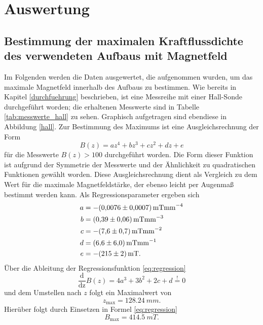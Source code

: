 \section{Auswertung}
\subsection{Bestimmung der maximalen Kraftflussdichte des verwendeten Aufbaus mit Magnetfeld}
Im Folgenden werden die Daten ausgewertet, die aufgenommen wurden, um das maximale Magnetfeld innerhalb des Aufbaus zu bestimmen. Wie bereits in Kapitel \ref{durchfuehrung} beschrieben, ist eine Messreihe mit einer Hall-Sonde durchgeführt worden; die erhaltenen Messwerte sind in Tabelle \ref{tab:messwerte_hall} zu sehen.
Graphisch aufgetragen sind ebendiese in Abbildung \ref{hall}. Zur Bestimmung des Maximums ist eine Ausgleichsrechnung der Form
\begin{equation}
B(z)=az^4+bz^3+cz^2+dz+e
\label{eq:regression}
\end{equation}
für die Messwerte $B(z)>100$ durchgeführt worden. Die Form dieser Funktion ist aufgrund der Symmetrie der Messwerte und der Ähnlichkeit zu quadratischen Funktionen gewählt worden. Diese Ausgleichsrechnung dient als Vergleich zu dem Wert für die maximale Magnetfeldstärke, der ebenso leicht per Augenmaß bestimmt werden kann.
Als Regressionsparameter ergeben sich
\begin{align*}
  a&=-\SI{0,0076 \pm 0,0007}{mTmm^{-4}}\\
  b&=\SI{0,39 \pm 0,06}{mTmm^{-3}}\\
  c&=-\SI{7,6 \pm 0,7}{mTmm^{-2}}\\
  d&=\SI{6,6 \pm 6,0}{mTmm^{-1}}\\
  e&=-\SI{215 \pm 2}{mT}.
\end{align*}
Über die Ableitung der Regressionsfunktion \eqref{eq:regression}
\begin{equation}
\frac{\text{d}}{\text{dz}}B(z)=4a^3+3b^2+2c+d \stackrel{!}{=} 0
\end{equation}
und dem Umstellen nach $z$ folgt ein Maximalwert von
\begin{equation}
 z_\text{max}=\SI{128,24}{mm}.
\end{equation}
Hierüber folgt durch Einsetzen in Formel \eqref{eq:regression}
\begin{equation}
B_\text{max}=\SI{414,5}{mT}.
\end{equation}
